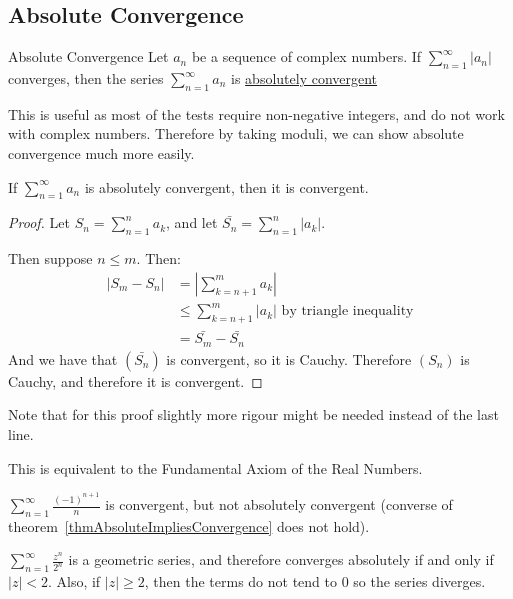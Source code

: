 \documentclass[../Main.tex]{subfiles}
\begin{document}
\subsection{Absolute Convergence}
\begin{definition}{Absolute Convergence}
    Let $a_n$ be a sequence of complex numbers. If $\sum_{n=1}^\infty |a_n|$ converges, then the series $\sum_{n=1}^\infty a_n$ is \underline{absolutely convergent}
\end{definition}
This is useful as most of the tests require non-negative integers, and do not work with complex numbers. Therefore by taking moduli, we can show absolute convergence much more easily.
\begin{theorem}
    If $\sum_{n=1}^\infty a_n$ is absolutely convergent, then it is convergent.
    \label{thmAbsoluteImpliesConvergence}
\end{theorem}
\begin{proof}
    Let $S_n = \sum_{n=1}^n a_k$, and let $\bar{S_n} = \sum_{n=1}^n |a_k|$.\par
    Then suppose $n \leq m$. Then:
    \begin{align*}
        |S_m - S_n| &= |\sum_{k=n+1}^m a_k| \\
        &\leq \sum_{k=n+1}^m |a_k| \text{ by triangle inequality} \\
        &= \bar{S_m} - \bar{S_n}
    \end{align*}
    And we have that $(\bar{S_n})$ is convergent, so it is Cauchy. Therefore $(S_n)$ is Cauchy, and therefore it is convergent.
\end{proof}
Note that for this proof slightly more rigour might be needed instead of the last line. \\
\begin{remark}
    This is equivalent to the Fundamental Axiom of the Real Numbers.
\end{remark}
\begin{examples}{}
    \item $\sum_{n=1}^\infty \frac{(-1)^{n+1}}{n}$ is convergent, but not absolutely convergent (converse of theorem~\ref{thmAbsoluteImpliesConvergence} does not hold).
    \item $\sum_{n=1}^\infty \frac{z^n}{2^n}$ is a geometric series, and therefore converges absolutely if and only if $|z| < 2$. Also, if $|z| \geq 2$, then the terms do not tend to 0 so the series diverges.
\end{examples}
\end{document}
